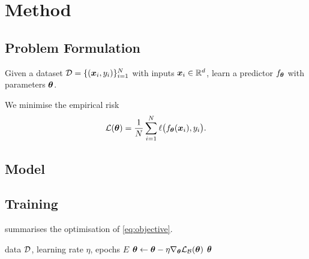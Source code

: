 \section{Method}\label{sec:method}


\subsection{Problem Formulation}\label{sec:problem}
\begin{definition}[Task]\label{def:task}
  Given a dataset $\mathcal{D} = \{(\bm{x}_i, y_i)\}_{i=1}^{N}$ with inputs $\bm{x}_i \in \mathbb{R}^{d}$, learn a predictor $f_{\bm{\theta}}$ with parameters $\bm{\theta}$.
\end{definition}
We minimise the empirical risk
\begin{equation}
  \mathcal{L}(\bm{\theta}) = \frac{1}{N} \sum_{i=1}^{N} \ell\bigl(f_{\bm{\theta}}(\bm{x}_i), y_i\bigr).
  \label{eq:objective}
\end{equation}

\subsection{Model}\label{sec:model}

\subsection{Training}\label{sec:training}
 summarises the optimisation of \cref{eq:objective}.

\begin{algorithm}[t]
  \caption{Training loop}\label{alg:train}
  \begin{algorithmic}[1]
    \Require data $\mathcal{D}$, learning rate $\eta$, epochs $E$
        \State $\bm{\theta} \gets \bm{\theta} - \eta \nabla_{\bm{\theta}} \mathcal{L}_{\mathcal{B}}(\bm{\theta})$
      \EndFor
    \EndFor
    \State \Return $\bm{\theta}$
  \end{algorithmic}
\end{algorithm}

